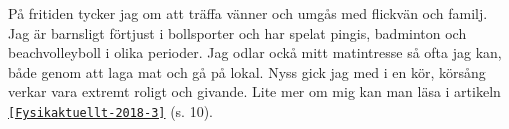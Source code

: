 


\begin{cvparagraph}
P{\aa} fritiden tycker jag om att tr{\"a}ffa v{\"a}nner och umg{\aa}s med flickv{\"a}n och familj.
Jag {\"a}r barnsligt f{\"o}rtjust i bollsporter och har spelat pingis, badminton och beachvolleyboll i olika perioder.
Jag odlar ock{\aa} mitt matintresse s{\aa} ofta jag kan, b{\aa}de genom att laga mat och g{\aa} p{\aa} lokal.
Nyss gick jag med i en kör, körsång verkar vara extremt roligt och givande.
Lite mer om mig kan man l{\"a}sa i artikeln \href{http://www.fysikersamfundet.se/wp-content/uploads/Fysikaktuellt3-18_Webb.pdf}{\texttt{[Fysikaktuellt-2018-3]}} (s. 10).
\end{cvparagraph}